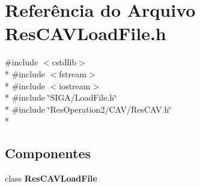\section{Referência do Arquivo Res\+C\+A\+V\+Load\+File.\+h}
\label{_2_c_a_v_2_res_c_a_v_load_file_8h}
{\ttfamily \#include $<$cstdlib$>$}\\*
{\ttfamily \#include $<$fstream$>$}\\*
{\ttfamily \#include $<$iostream$>$}\\*
{\ttfamily \#include \char`\"{}S\+I\+G\+A/\+Load\+File.\+h\char`\"{}}\\*
{\ttfamily \#include \char`\"{}Res\+Operation2/\+C\+A\+V/\+Res\+C\+A\+V.\+h\char`\"{}}\\*
\subsection*{Componentes}
\begin{DoxyCompactItemize}
\item 
class {\bf Res\+C\+A\+V\+Load\+File}
\end{DoxyCompactItemize}
